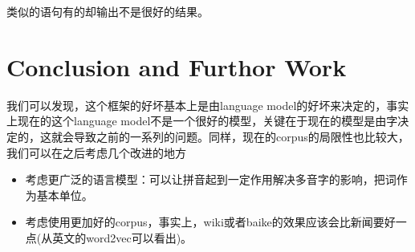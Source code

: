 \documentclass{article}
\begin{document}
类似的语句有的却输出不是很好的结果。

\section{Conclusion and Furthor Work}

我们可以发现，这个框架的好坏基本上是由language model的好坏来决定的，事实上现在的这个language model不是一个很好的模型，关键在于现在的模型是由字决定的，这就会导致之前的一系列的问题。同样，现在的corpus的局限性也比较大，我们可以在之后考虑几个改进的地方

\begin{itemize}
	\item 考虑更广泛的语言模型：可以让拼音起到一定作用解决多音字的影响，把词作为基本单位。
	\item 考虑使用更加好的corpus，事实上，wiki或者baike的效果应该会比新闻要好一点(从英文的word2vec可以看出)。
\end{itemize}
\end{document}
